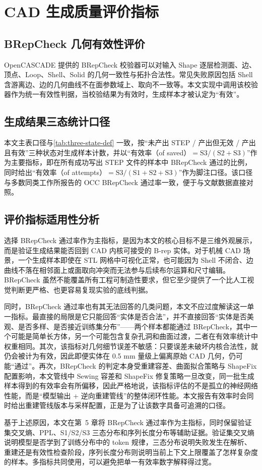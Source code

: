 \section{CAD 生成质量评价指标}

\subsection{BRepCheck 几何有效性评价}

\begin{sloppypar}
OpenCASCADE 提供的 BRepCheck 校验器可以对输入 Shape 逐层检测面、边、顶点、Loop、Shell、Solid 的几何一致性与拓扑合法性。常见失败原因包括 Shell 含游离边、边的几何曲线不在面参数域上、取向不一致等。本文实现中调用该校验器作为统一有效性判据，当校验结果为有效时，生成样本才被认定为“有效”。
\end{sloppypar}

\subsection{生成结果三态统计口径}

本文主表口径与\autoref{tab:three-state-def} 一致，按“未产出 STEP / 产出但无效 / 产出且有效”三种状态对生成样本计数，并以“有效率（of saved）$= \mathrm{S3} / (\mathrm{S2} + \mathrm{S3})$”作为主要指标，即在所有成功写出 STEP 文件的样本中 BRepCheck 通过的比例，同时给出“有效率（of attempts）$= \mathrm{S3} / (\mathrm{S1} + \mathrm{S2} + \mathrm{S3})$”作为脚注口径。该口径与多数同类工作所报告的 OCC BRepCheck 通过率一致，便于与文献数据直接对照。

\subsection{评价指标适用性分析}

选择 BRepCheck 通过率作为主指标，是因为本文的核心目标不是三维外观展示，而是验证生成结果能否回到 CAD 内核可接受的 B-rep 实体。对于机械 CAD 场景，一个生成样本即使在 STL 网格中可视化正常，也可能因为 Shell 不闭合、边曲线不落在相邻面上或面取向冲突而无法参与后续布尔运算和尺寸编辑。BRepCheck 虽然不能覆盖所有工程可制造性要求，但它至少提供了一个比人工视觉判断更严格、也更容易复现实验的底线判据。

同时，BRepCheck 通过率也有其无法回答的几类问题，本文不应过度解读这一单一指标。最直接的局限是它只能回答“实体是否合法”，并不直接回答“实体是否美观、是否多样、是否接近训练集分布”——两个样本都能通过 BRepCheck，其中一个可能是简单长方体，另一个可能包含复杂孔洞和曲面过渡，二者在有效率统计中权重相同。其次，该指标对几何细节误差不敏感：只要误差未破坏内核合法性，就仍会被计为有效，因此即便实体在 0.5 mm 量级上偏离原始 CAD 几何，仍可能“通过”。再次，BRepCheck 的判定本身受重建容差、曲面拟合策略与 ShapeFix 配置影响，本文管线中 Sewing 容差和 ShapeFix 修复策略一旦改变，同一批生成样本得到的有效率会有所偏移，因此严格地说，该指标评估的不是孤立的神经网络性能，而是“模型输出 + 逆向重建管线”的整体闭环性能。本文报告有效率时会同时给出重建管线版本与采样配置，正是为了让该数字具备可追溯的口径。

基于上述原因，本文在第~5 章将 BRepCheck 通过率作为主指标，同时保留验证集交叉熵、PPL、S1/S2/S3 三态分布和序列长度分布等辅助证据。验证集交叉熵说明模型是否学到了训练分布中的 token 规律，三态分布说明失败发生在解析、重建还是有效性检查阶段，序列长度分布则说明当前上下文上限覆盖了怎样复杂度的样本。多指标共同使用，可以避免把单一有效率数字解释得过宽。
